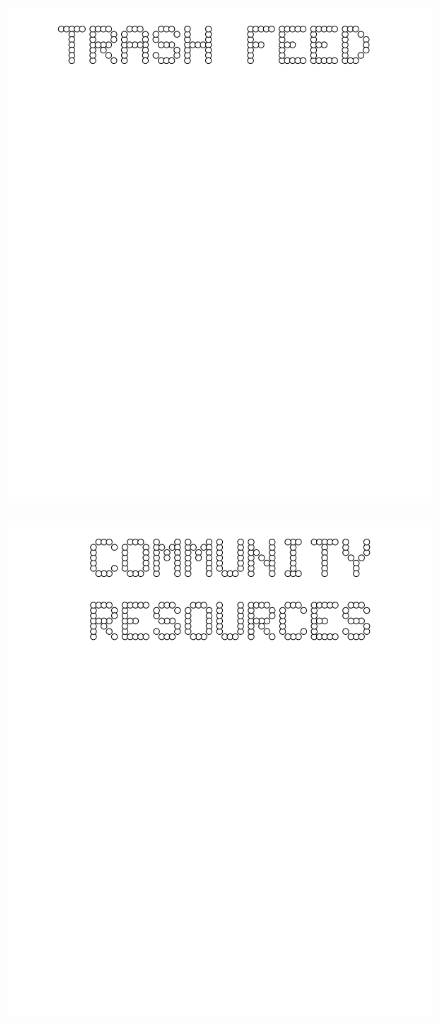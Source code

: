 \documentclass[17pt]{extreport}
\begin{document}
	\begin{figure}
		\centering
		\includegraphics[width=6.25in]{imageserver/uploadimages/trashfeed.png}
	\end{figure}
	\begin{figure}
		\centering
		\includegraphics[width=6.25in]{imageserver/uploadimages/community.png}
	\end{figure}	
\end{document}
